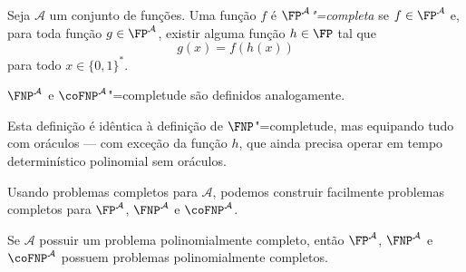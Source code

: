 \begin{definition}
    Seja $\mathcal A$ um conjunto de funções.
    Uma função $f$ é \emph{$\FP^\mathcal A$"=completa}
    se $f \in \FP^\mathcal A$ e,
    para toda função $g \in \FP^\mathcal A$,
    existir alguma função $h \in \FP$ tal que
    \begin{equation*}
        g(x) = f(h(x))
    \end{equation*}
    para todo $x \in \{0, 1\}^*$.

    $\FNP^\mathcal A$ e $\coFNP^\mathcal A$"=completude
    são definidos analogamente.
\end{definition}

Esta definição é idêntica à definição de $\FNP$"=completude,
mas equipando tudo com oráculos
--- com exceção da função $h$,
que ainda precisa operar em tempo determinístico polinomial sem oráculos.

Usando problemas completos para $\mathcal A$,
podemos construir facilmente problemas completos para $\FP^\mathcal A$,
$\FNP^\mathcal A$ e $\coFNP^\mathcal A$.

\begin{theorem}
    Se $\mathcal A$ possuir um problema polinomialmente completo,
    então $\FP^\mathcal A$, $\FNP^\mathcal A$ e $\coFNP^\mathcal A$
    possuem problemas polinomialmente completos.
    \label{thm:polinomially_complete_problems}
\end{theorem}

